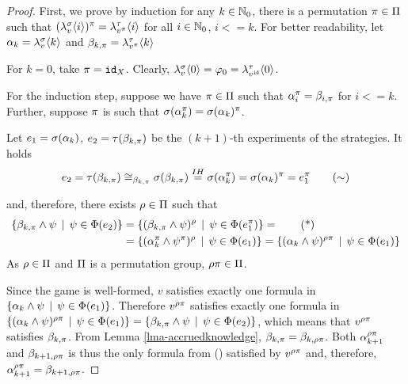 \begin{proof}
First, we prove by induction for any $k\in\mathbb{N}_0$,
  there is a permutation $\pi\in \Pi$ such that
  $(\lambda^{\sigma}_{v}\langle i\rangle)^\pi = \lambda^{\tau}_{v^\pi}\langle i\rangle$
  for all $i\in\mathbb{N}_0$, $i<=k$.
For better readability, let
  $\alpha_k = \lambda^{\sigma}_{v}\langle k\rangle$ and
  $\beta_{k, \pi} = \lambda^{\tau}_{v^\pi}\langle k\rangle$

For $k=0$, take $\pi = \mathtt{id}_X$.
Clearly, $\lambda^{\sigma}_{v}\langle0\rangle = \varphi_0 = \lambda^{\tau}_{v^{\mathtt{id}}}\langle0\rangle$.

For the induction step, suppose we have $\pi\in\Pi$ such that
  $\alpha_i^\pi = \beta_{i, \pi}$ for $i <= k$.
Further, suppose $\pi$ is such that
  $\sigma(\alpha_k^\pi) = \sigma(\alpha_k)^\pi$. 

Let $e_1 = \sigma(\alpha_k)$, $e_2 = \tau(\beta_{k, \pi})$
  be the $(k+1)$-th experiments  of the strategies.
It holds
\begin{equation}
e_2 = \tau(\beta_{k, \pi})
    \cong_{\beta_{k, \pi}}  \sigma(\beta_{k, \pi})
    \stackrel{IH}{=} \sigma(\alpha_k^\pi)
    = \sigma(\alpha_k)^\pi
    = e_1^\pi \label{eq:expsym}\tag{$\sim$}
\end{equation}

and, therefore, there exists $\rho\in\Pi$ such that
\begin{align}
 \{ \knowx_{k, \perm} \wedge \formx \| \formx\in\outcome(\exp_2) \} &= %
 \{ (\knowx_{k, \perm} \wedge \formx)^\permx \| \formx\in\outcome(\exp_1^\perm) \} = \label{eq:sets}\tag{*}\\
&= \{ (\know_k^\perm \wedge \formx^\perm)^\permx \| \formx\in\outcome(\exp_1) \} =
 \{ (\know_k \wedge \formx)^{\permx\perm} \| \formx\in\outcome(\exp_1) \}
\end{align}
As $\rho\in\Pi$ and $\Pi$ is a permutation group, $\rho\pi\in\Pi$.

Since the game is well-formed,
  $v$ satisfies exactly one formula in
  $\{ \alpha_k \wedge \psi \:\:|\:\: \psi\in\Phi(e_1) \}$.
Therefore $v^{\rho\pi}$ satisfies exactly one formula
  in
  $\{ (\alpha_k \wedge \psi)^{\rho\pi} \:\:|\:\: \psi\in\Phi(e_1) \}  =
   \{ \beta_{k, \pi} \wedge \psi \:\:|\:\: \psi\in\Phi(e_2) \}$,
  which means that $v^{\rho\pi}$ satisfies $\beta_{k, \pi}$.
From Lemma \ref{lma-accruedknowledge},
  $\beta_{k, \pi} = \beta_{k, \rho\pi}$.
Both $\alpha_{k+1}^{\rho\pi}$ and $\beta_{k+1, \rho\pi}$ is thus the only
  formula from () satisfied by $v^{\rho\pi}$ and, therefore,
  $\alpha_{k+1}^{\rho\pi} = \beta_{k+1, \rho\pi}$.




\end{proof}
